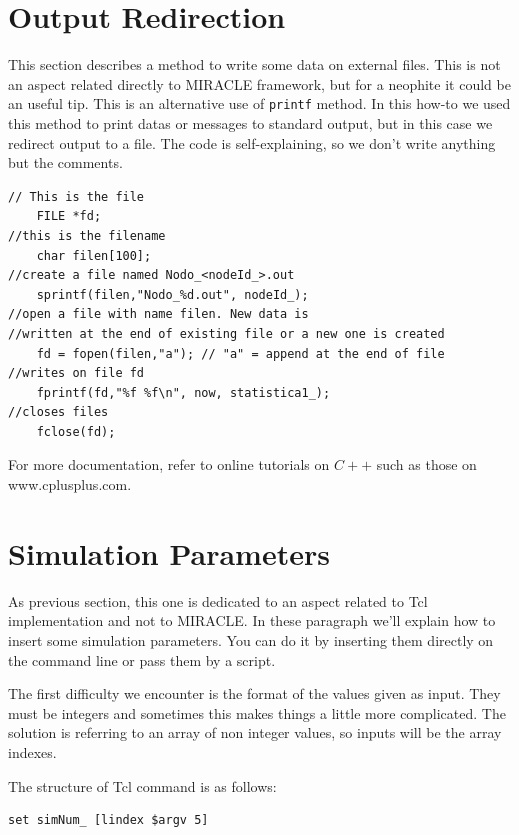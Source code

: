 \documentclass[a4paper,10pt]{article}
\begin{document}

\section{Output Redirection}

This section describes a method to write some data on external files. This is not an aspect related directly to MIRACLE framework, but for a neophite it could be an useful tip.
This is an alternative use of \verb=printf= method. In this how-to we used this method to print datas or messages to standard output, but in this case we redirect output to a file.
The code is self-explaining, so we don't write anything but the comments.

\begin{verbatim}
// This is the file
	FILE *fd;
//this is the filename
	char filen[100];
//create a file named Nodo_<nodeId_>.out
	sprintf(filen,"Nodo_%d.out", nodeId_);
//open a file with name filen. New data is
//written at the end of existing file or a new one is created
	fd = fopen(filen,"a"); // "a" = append at the end of file
//writes on file fd
	fprintf(fd,"%f %f\n", now, statistica1_);
//closes files
	fclose(fd);
\end{verbatim}

For more documentation, refer to online tutorials on $C++$ such as those on www.cplusplus.com.

\section{Simulation Parameters}

As previous section, this one is dedicated to an aspect related to Tcl implementation and not to MIRACLE.
In these paragraph we'll explain how to insert some simulation parameters. You can do it by inserting them directly on the command line or pass them by a script.

The first difficulty we encounter is the format of the values given as input. They must be integers and sometimes this makes things a little more complicated. The solution is referring to an array of non integer values, so inputs will be the array indexes.

The structure of Tcl command is as follows:

\begin{verbatim}
set simNum_ [lindex $argv 5]
\end{verbatim}
\end{document}
